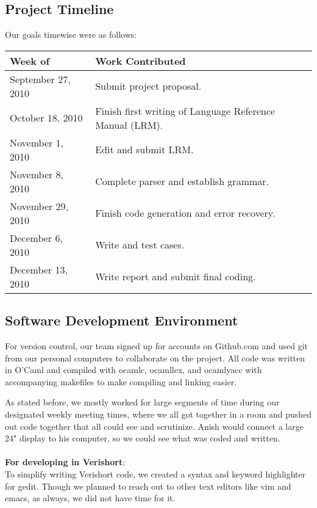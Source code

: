 \documentclass[letterpaper,11pt]{article}
\begin{document}
    \subsection{Project Timeline}
    	Our goals timewise were as follows:
	\begin{center} 
    \begin{tabular}{|l|p{4in}|} \hline
    Week of&Work Contributed\\ \hline
    September 27, 2010 & Submit project proposal. \\
    October 18, 2010 & Finish first writing of Language Reference Manual (LRM). \\
    November 1, 2010 & Edit and submit LRM.  \\
    November 8, 2010 & Complete parser and establish grammar.  \\ %
    November 29, 2010 & Finish code generation and error recovery. \\ %
    December 6, 2010 & Write and test cases. \\ %
    December 13, 2010 & Write report and submit final coding. \\ \hline %
    \end{tabular}
    \end{center}
    
    \subsection{Software Development Environment}
    For version control, our team signed up for accounts on Github.com and used git from our 
    personal computers to collaborate on the project. All code was written in O'Caml and compiled with ocamlc, ocamllex,
    and ocamlyacc with accompanying makefiles to make compiling and linking easier.  
    
    As stated before, we mostly worked for large segments of time during our designated weekly meeting times, where we all 
    got together in a room and pushed out code together that all could see and scrutinize. Anish would connect a large
    24" display to his computer, so we could see what was coded and written.\\\\
    \textbf{For developing in Verishort}:\\
    To simplify writing Verishort code, we created a syntax and keyword highlighter for gedit. Though we planned to reach
    out to other text editors like vim and emacs, as always, we did not have time for it.
    
\end{document}
